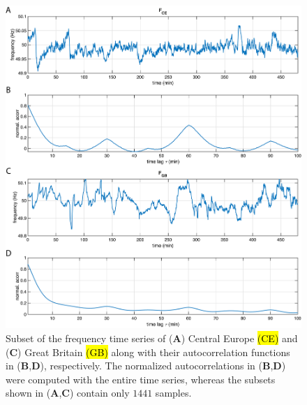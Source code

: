\documentclass[entropy,article,accept,pdftex,moreauthors]{Definitions/mdpi}
\begin{document}
\begin{figure}[H]
 \includegraphics[width=\textwidth]{./figures/fig_power_grid_time_series}
 \caption{Subset of the frequency time series of (\textbf{A}) Central Europe \hl{(CE)} %
 \cite{haehne2018footprint} and (\textbf{C}) Great Britain \hl{(GB)} %
 \cite{GB} along with their autocorrelation functions in (\textbf{B},\textbf{D}), respectively. The normalized autocorrelations in (\textbf{B},\textbf{D}) were computed with the entire time series, whereas the subsets shown in (\textbf{A},\textbf{C}) 
 contain only $1441$ samples.}
\label{fig_power_grid_time_series}
\end{figure}
\end{document}
